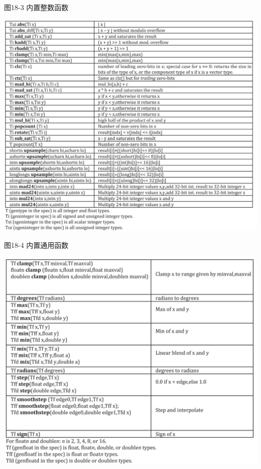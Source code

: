 \hspace*{\fill} \par %
图18-3 内置整数函数
\begin{center}
	\includegraphics[width=1.0\textwidth]{content/chapter-18/images/3}
\end{center}

\hspace*{\fill} \par %
图18-4 内置通用函数
\begin{center}
	\includegraphics[width=1.0\textwidth]{content/chapter-18/images/4}
\end{center}

